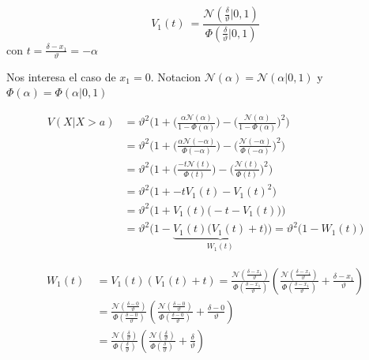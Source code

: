 \documentclass[11pt,twoside,spanish]{report} %
\begin{document}
\begin{equation}
	V_1(t)\ = \frac{\mathcal{N}(\frac{\delta}{\vartheta}|0,1)}{\Phi(\frac{\delta}{\vartheta}|0,1) }
\end{equation}
con $t = \frac{\delta -x_1}{\vartheta} = -\alpha  $

Nos interesa el caso de $x_1=0$. Notacion $\mathcal{N}(\alpha)=\mathcal{N}(\alpha|0,1)$ y $\Phi(\alpha) = \Phi(\alpha|0,1)$

\begin{equation}\label{eq:variance_aprox_}
	\begin{split}
		V(X|  X > a) & = \vartheta^2 \Bigg( 1 + \bigg(\frac{\alpha \mathcal{N}(\alpha)}{1 - \Phi(\alpha) }\bigg) - \bigg(\frac{\mathcal{N}(\alpha)}{1 - \Phi(\alpha) }\bigg)^2 \Bigg) \\
		& = \vartheta^2 \Bigg( 1 + \bigg(\frac{\alpha \mathcal{N}(-\alpha)}{\Phi(-\alpha) }\bigg) - \bigg(\frac{\mathcal{N}(-\alpha)}{\Phi(-\alpha) }\bigg)^2 \Bigg) \\
		& = \vartheta^2 \Bigg( 1 + \bigg(\frac{-t \mathcal{N}(t)}{\Phi(t) }\bigg) - \bigg(\frac{\mathcal{N}(t)}{\Phi(t) }\bigg)^2 \Bigg) \\
		& = \vartheta^2 \Big( 1 +  -t V_1(t) - V_1(t)^2 \Big) \\
		& = \vartheta^2 \Big( 1 + V_1(t) \big(-t  - V_1(t)\big) \Big)  \\
		& = \vartheta^2 \Big( 1 - \underbrace{V_1(t) \big(V_1(t) + t \big)}_{W_1(t)} \Big)  = \vartheta^2 \big( 1 - W_1(t) \big)
	\end{split}
\end{equation}

\begin{equation}
	\begin{split}
		W_1(t)\ &= V_1(t)(V_1(t) + t) = \frac{\mathcal{N}(\frac{\delta-x_1}{\vartheta})}{\Phi(\frac{\delta-x_1}{\vartheta})}\left(\frac{\mathcal{N}(\frac{\delta-x_1}{\vartheta})}{\Phi(\frac{\delta-x_1}{\vartheta})}+ \frac{\delta -x_1}{\vartheta}\right) \\
		&=\frac{\mathcal{N}(\frac{\delta-0}{\vartheta})}{\Phi(\frac{\delta-0}{\vartheta})}\left(\frac{\mathcal{N}(\frac{\delta-0}{\vartheta})}{\Phi(\frac{\delta-0}{\vartheta})}+ \frac{\delta -0}{\vartheta}\right)\\
		&=\frac{\mathcal{N}(\frac{\delta}{\vartheta})}{\Phi(\frac{\delta}{\vartheta})}\left(\frac{\mathcal{N}(\frac{\delta}{\vartheta})}{\Phi(\frac{\delta}{\vartheta})}+ \frac{\delta}{\vartheta}\right)
	\end{split}
\end{equation}
\end{document}
